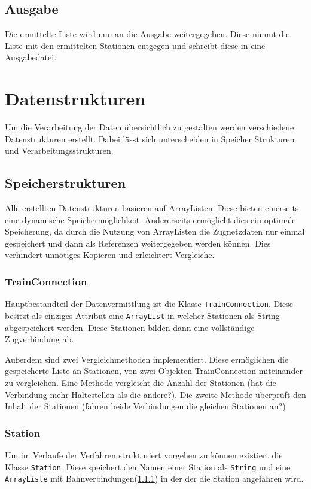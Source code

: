 \subsection{Ausgabe}\label{ver:subsec:ausgabe}
Die ermittelte Liste wird nun an die Ausgabe weitergegeben. Diese nimmt die Liste mit den ermittelten Stationen entgegen und schreibt diese in eine Ausgabedatei.\\

\section{Datenstrukturen}\label{ver:subsec:datenstrukturen}
Um die Verarbeitung der Daten übersichtlich zu gestalten werden verschiedene Datenstrukturen erstellt. Dabei lässt sich unterscheiden in Speicher Strukturen und Verarbeitungsstrukturen.\\
\subsection{Speicherstrukturen}\label{ver:subsec:Speicherstrukturen}
Alle erstellten Datenstrukturen basieren auf ArrayListen. Diese bieten einerseits eine dynamische Speichermöglichkeit. Andererseits ermöglicht dies ein optimale Speicherung, da durch die Nutzung von ArrayListen die Zugnetzdaten nur einmal gespeichert und dann als Referenzen weitergegeben werden können. Dies verhindert unnötiges Kopieren und erleichtert Vergleiche.\\

\subsubsection{TrainConnection}\label{ver:subsubsec:trainconnection}
Hauptbestandteil der Datenvermittlung ist die Klasse \texttt{TrainConnection}. Diese besitzt als einziges Attribut eine \texttt{ArrayList} in welcher Stationen als String abgespeichert werden. Diese Stationen bilden dann eine vollständige  Zugverbindung ab.

Außerdem sind zwei Vergleichmethoden implementiert. Diese ermöglichen die gespeicherte Liste an Stationen, von zwei Objekten TrainConnection
 miteinander zu vergleichen. Eine Methode vergleicht die Anzahl der Stationen (hat die Verbindung mehr Haltestellen als die andere?). Die zweite Methode überprüft den Inhalt der Stationen (fahren beide Verbindungen die gleichen Stationen an?)\\

\subsubsection{Station}\label{ver:subsubsec:station}
Um im Verlaufe der Verfahren strukturiert vorgehen zu können existiert die Klasse \texttt{Station}. Diese speichert den Namen einer Station als \texttt{String} und eine \texttt{ArrayListe} mit Bahnverbindungen(\ref{ver:subsubsec:trainconnection}) in der der die Station angefahren wird.

